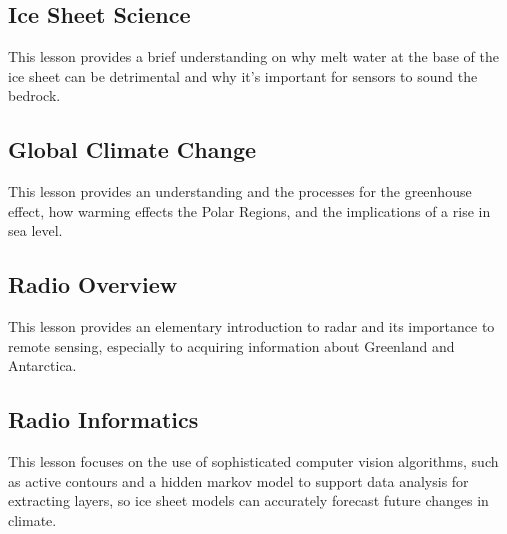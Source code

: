 
\subsection{Ice Sheet Science}\label{ice-sheet-science}

This lesson provides a brief understanding on why melt water at the base
of the ice sheet can be detrimental and why it's important for sensors
to sound the bedrock.


\subsection{Global Climate Change}\label{global-climate-change}

This lesson provides an understanding and the processes for the
greenhouse effect, how warming effects the Polar Regions, and the
implications of a rise in sea level.


\subsection{Radio Overview}\label{radio-overview}

This lesson provides an elementary introduction to radar and its
importance to remote sensing, especially to acquiring information about
Greenland and Antarctica.


\subsection{Radio Informatics}\label{radio-informatics}

This lesson focuses on the use of sophisticated computer vision
algorithms, such as active contours and a hidden markov model to support
data analysis for extracting layers, so ice sheet models can accurately
forecast future changes in climate.

